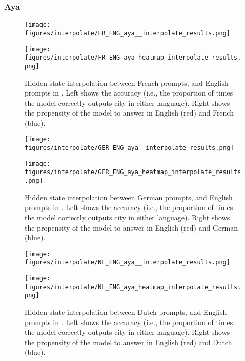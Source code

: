 \subsubsection{Aya}

\begin{figure}[h]
\begin{minipage}{0.49\textwidth}
    \centering
    \texttt{[image: figures/interpolate/FR\_ENG\_aya\_\_interpolate\_results.png]} 
\end{minipage}
\begin{minipage}{0.49\textwidth}
    \centering
    \texttt{[image: figures/interpolate/FR\_ENG\_aya\_heatmap\_interpolate\_results.png]} 
\end{minipage}
\caption{Hidden state interpolation between French prompts, and English prompts in \aya. Left shows the accuracy (i.e., the proportion of times the model correctly outputs city in either language). Right shows the propensity of the model to answer in English (red) and French (blue). }
\end{figure}

\begin{figure}[h]
\begin{minipage}{0.49\textwidth}
    \centering
    \texttt{[image: figures/interpolate/GER\_ENG\_aya\_\_interpolate\_results.png]} 
\end{minipage}
\begin{minipage}{0.49\textwidth}
    \centering
    \texttt{[image: figures/interpolate/GER\_ENG\_aya\_heatmap\_interpolate\_results.png]} 
\end{minipage}
\caption{Hidden state interpolation between German prompts, and English prompts in \aya. Left shows the accuracy (i.e., the proportion of times the model correctly outputs city in either language). Right shows the propensity of the model to answer in English (red) and German (blue). }
\end{figure}

\begin{figure}[h]
\begin{minipage}{0.49\textwidth}
    \centering
    \texttt{[image: figures/interpolate/NL\_ENG\_aya\_\_interpolate\_results.png]} 
\end{minipage}
\begin{minipage}{0.49\textwidth}
    \centering
    \texttt{[image: figures/interpolate/NL\_ENG\_aya\_heatmap\_interpolate\_results.png]} 
\end{minipage}
\caption{Hidden state interpolation between Dutch prompts, and English prompts in \aya. Left shows the accuracy (i.e., the proportion of times the model correctly outputs city in either language). Right shows the propensity of the model to answer in English (red) and Dutch (blue). }
\end{figure}

